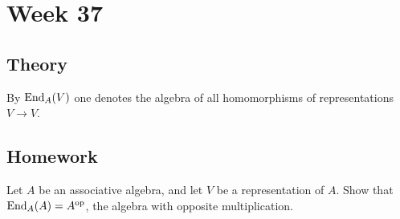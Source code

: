 \section{Week 37}

\subsection{Theory}

\begin{defn}
By \(\operatorname{End}_{A} (V)\) one denotes the algebra of all homomorphisms of representations \(V\rightarrow V\).
\end{defn}

\subsection{Homework}

\begin{thm}
Let \(A\) be an associative algebra, and let \(V\) be a representation of \(A\). Show that \(\operatorname{End}_{A} (A)= A^{\text{op}}\), the algebra with opposite multiplication.
\end{thm}

